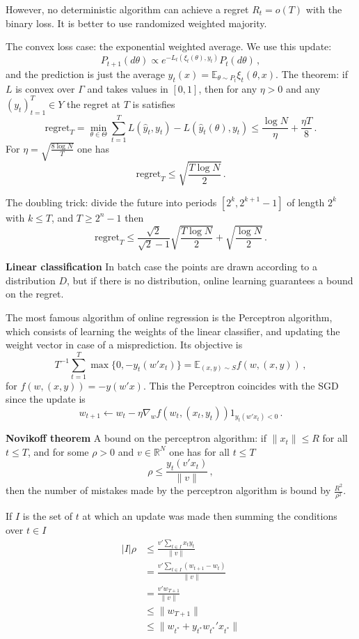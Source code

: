\documentclass[a4paper]{article}
\newcommand{\Real}{\mathbb{R}}
\newcommand{\ex}{\mathbb{E}}
\begin{document}
However, no deterministic algorithm can achieve a regret $R_t = o(T)$ with the binary
loss. It is better to use randomized weighted majority.

The convex loss case: the exponential weighted average. We use this update:
\[P_{t+1}(d\theta) \propto e^{-L_t(\xi_t(\theta), y_t)} P_t(d\theta) \,,\]
and the prediction is just the average $\hat{y}_t(x) = \ex_{\theta\sim P_t} \xi_t(\theta, x)$.
The theorem: if $L$ is convex over $\Gamma$ and takes values in $[0,1]$, then for
any $\eta>0$ and any $(y_t)_{t=1}^T\in Y$ the regret at $T$ is satisfies
\[ \text{regret}_T = \min_{\theta\in \Theta} \sum_{t=1}^T L(\hat{y}_t, y_t) - L(\hat{y}_t(\theta), y_t)
    \leq \frac{\log N}{\eta} + \frac{\eta T}{8} \,. \]
For $\eta = \sqrt{\frac{8\log N}{T}}$ one has
\[ \text{regret}_T \leq \sqrt{\frac{T \log N}{2}} \,.\]

The doubling trick: divide the future into periods $[2^k, 2^{k+1}-1]$ of length
$2^k$ with $k\leq T$, and $T\geq 2^n-1$ then
\[ \text{regret}_T
    \leq \frac{\sqrt{2}}{\sqrt{2}-1} \sqrt{\frac{T \log N}{2}}
    + \sqrt{\frac{\log N}{2}}
    \,. \]

\textbf{Linear classification}
In batch case the points are drawn according to a distribution $D$, but if there
is no distribution, online learning guarantees a bound on the regret.

The most famous algorithm of online regression is the Perceptron algorithm, which
consists of learning the weights of the linear classifier, and updating the weight
vector in case of a misprediction. Its objective is
\[ T^{-1} \sum_{t=1}^T \max\{0, -y_t (w'x_t) \} = \ex_{(x, y)\sim S} f(w, (x, y)) \,,\]
for $f(w, (x, y)) = - y (w'x)$. This the Perceptron coincides with the SGD since
the update is
\[ w_{t+1} \leftarrow w_t - \eta \nabla_w f(w_t, (x_t, y_t)) 1_{y_t (w'x_t) < 0} \,. \]

\textbf{Novikoff theorem} A bound on the perceptron algorithm: if $\|x_t\| \leq R$
for all $t\leq T$, and for some $\rho>0$ and $v\in \Real^N$ one has for all $t\leq T$
\[ \rho \leq \frac{y_t (v'x_t)}{\|v\|} \,, \]
then the number of mistakes made by the perceptron algorithm is bound by $\frac{R^2}{\rho^2}$.

If $I$ is the set of $t$ at which an update was made then summing the conditions
over $t\in I$
\begin{align*}
    |I|\rho
        &\leq \frac{v'\sum_{t\in I} x_t y_t }{\|v\|} \\
        &= \frac{v'\sum_{t\in I} (w_{t+1} - w_t) }{\|v\|} \\
        &= \frac{v'w_{T+1} }{\|v\|} \\
        &\leq \| w_{T+1} \| \\
        &\leq \| w_{t^*} + y_{t^*} w_{t^*}'x_{t^*} \| \\
\end{align*}
\end{document}
